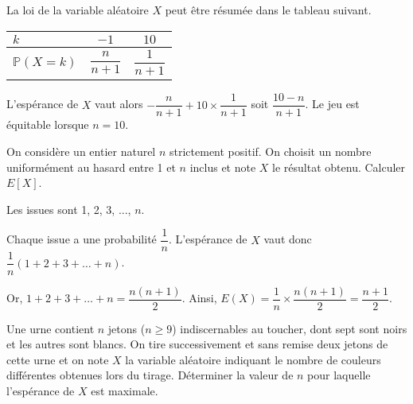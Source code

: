 \documentclass[11pt,fleqn, openany]{book} %
\begin{document}
\begin{solution}La loi de la variable aléatoire $X$ peut être résumée dans le tableau suivant.
\begin{center}
\begin{tabular}{|l|c|c|}
\hline
$k$ & $-1$ & $10$ \\
\hline
$\mathbb{P}(X=k)$ & $\dfrac{n}{n+1}$  & $\dfrac{1}{n+1}$ \\
\hline \end{tabular}
\end{center}

L'espérance de $X$ vaut alors $-\dfrac{n}{n+1}+10 \times \dfrac{1}{n+1}$ soit $\dfrac{10-n}{n+1}$. Le jeu est équitable lorsque $n=10$.\end{solution}



\begin{exercise}On considère un entier naturel $n$ strictement positif. On choisit un nombre uniformément au hasard entre 1 et $n$ inclus et note $X$ le résultat obtenu. Calculer $E[X]$.\end{exercise}


\begin{solution}Les issues sont 1, 2, 3, ..., $n$. 

Chaque issue a une probabilité $\dfrac{1}{n}$. L'espérance de $X$ vaut donc $\dfrac{1}{n}(1+2+3+\dots + n)$.

Or, $1+2+3+\dots + n=\dfrac{n(n+1)}{2}$. Ainsi, $E(X)=\dfrac{1}{n} \times \dfrac{n(n+1)}{2}=\dfrac{n+1}{2}$.\end{solution}



\begin{exercise}Une urne contient $n$ jetons ($n \geqslant 9$) indiscernables au toucher, dont sept sont noirs et les autres sont blancs. On tire successivement et sans remise deux jetons de cette urne et on note $X$ la variable aléatoire indiquant le nombre de couleurs différentes obtenues lors du tirage. Déterminer la valeur de $n$ pour laquelle l'espérance de $X$ est maximale.\end{exercise}
\end{document}
